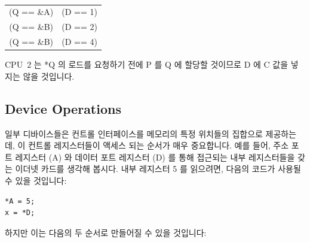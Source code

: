 \vspace{5pt}
\begin{minipage}[t]{\columnwidth}
\tt
\scriptsize
\begin{tabular}{c@{ and }c}
	(Q == \&A) & (D == 1) \\
	(Q == \&B) & (D == 2) \\
	(Q == \&B) & (D == 4) \\
\end{tabular}
\end{minipage}
\vspace{5pt}

CPU~2 는 *Q 의 로드를 요청하기 전에 P 를 Q 에 할당할 것이므로 D 에 C 값을
넣지는 않을 것입니다.

\subsection{Device Operations}
\label{sec:advsync:Device Operations}

일부 디바이스들은 컨트롤 인터페이스를 메모리의 특정 위치들의 집합으로
제공하는데, 이 컨트롤 레지스터들이 액세스 되는 순서가 매우 중요합니다.
예를 들어, 주소 포트 레지스터 (A) 와 데이터 포트 레지스터 (D) 를 통해 접근되는
내부 레지스터들을 갖는 이더넷 카드를 생각해 봅시다.
내부 레지스터 5 를 읽으려면, 다음의 코드가 사용될 수 있을 것입니다:

\vspace{5pt}
\begin{minipage}[t]{\columnwidth}
\scriptsize
\begin{verbatim}
*A = 5;
x = *D;
\end{verbatim}
\end{minipage}
\vspace{5pt}

하지만 이는 다음의 두 순서로 만들어질 수 있을 것입니다:

